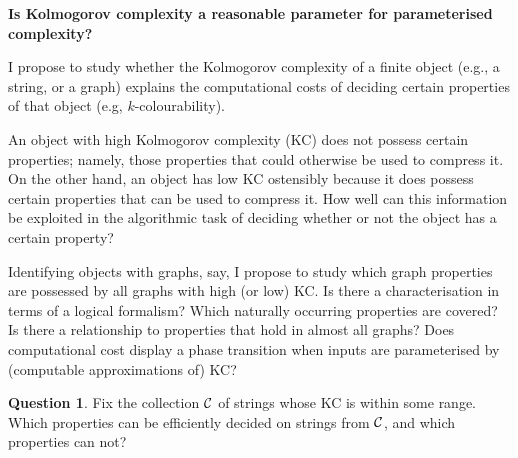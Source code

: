\documentclass{article}
\theoremstyle{plain} \numberwithin{equation}{section}
\theoremstyle{definition}
\newtheorem{question}{Question} \topmargin-2cm
\begin{document}
\thispagestyle{fancy}

\begin{center}
{\bf Is Kolmogorov complexity a reasonable parameter for parameterised complexity?}
\end{center}

\noindent
I propose to study whether the Kolmogorov complexity of a finite object (e.g., a string, or a graph) explains the computational costs of deciding certain properties of that object (e.g, $k$-colourability).



\smallskip

An object with high Kolmogorov complexity (KC) does not possess certain properties; namely, those properties that could otherwise be used to compress it. On the other hand, an object has low KC ostensibly because it does possess certain properties that can be used to compress it. How well can this information be exploited in the algorithmic task of deciding whether or not the object has a certain property?

\smallskip


Identifying objects with graphs, say, I propose to study which graph properties are possessed by all graphs with high (or low) KC.
Is there a characterisation in terms of a logical formalism?
Which naturally occurring properties are covered?
Is there a relationship to properties that hold in almost all
graphs? Does computational cost display a phase transition when inputs are parameterised by (computable approximations of) KC?


\iffalse
\begin{question}
Fix the collection ${\mathcal C}$ of strings whose KC is within some range. Which properties can be efficiently decided on strings from ${\mathcal C}$, and which properties can not?
\end{question}

\end{document}

